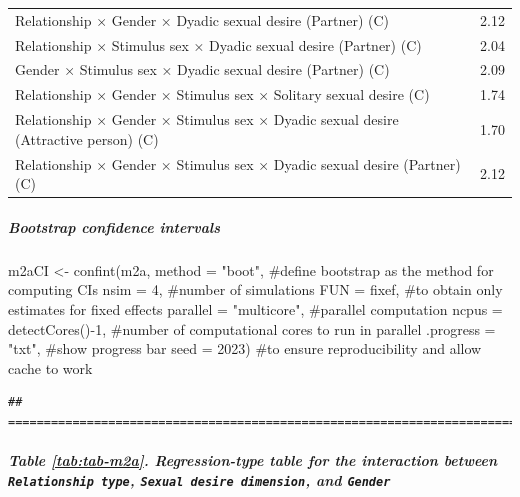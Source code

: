 \documentclass[
  bookmarksnumbered]{article}
\newenvironment{Shaded}{\begin{snugshade}}{\end{snugshade}}
\newcommand{\AttributeTok}[1]{\textcolor[rgb]{0.80,0.80,0.80}{#1}}
\newcommand{\CommentTok}[1]{\textcolor[rgb]{0.50,0.62,0.50}{#1}}
\newcommand{\DecValTok}[1]{\textcolor[rgb]{0.86,0.86,0.80}{#1}}
\newcommand{\FunctionTok}[1]{\textcolor[rgb]{0.94,0.94,0.56}{#1}}
\newcommand{\NormalTok}[1]{\textcolor[rgb]{0.80,0.80,0.80}{#1}}
\newcommand{\OtherTok}[1]{\textcolor[rgb]{0.94,0.94,0.56}{#1}}
\newcommand{\SpecialCharTok}[1]{\textcolor[rgb]{0.86,0.64,0.64}{#1}}
\newcommand{\StringTok}[1]{\textcolor[rgb]{0.80,0.58,0.58}{#1}}
\begin{document}
\begin{table}[H]
\begin{tabular}[t]{lc}
Relationship × Gender × Dyadic sexual desire (Partner) (C) & 2.12\\
Relationship × Stimulus sex × Dyadic sexual desire (Partner) (C) & 2.04\\
Gender × Stimulus sex × Dyadic sexual desire (Partner) (C) & 2.09\\
Relationship × Gender × Stimulus sex × Solitary sexual desire (C) & 1.74\\
Relationship × Gender × Stimulus sex × Dyadic sexual desire (Attractive person) (C) & 1.70\\
Relationship × Gender × Stimulus sex × Dyadic sexual desire (Partner) (C) & 2.12\\
\bottomrule
\end{tabular}
\end{table}

\hypertarget{bootstrap-confidence-intervals}{%
\subparagraph{Bootstrap confidence intervals}\label{bootstrap-confidence-intervals}}

\begin{Shaded}
\begin{Highlighting}[]
\NormalTok{m2aCI }\OtherTok{\textless{}{-}} \FunctionTok{confint}\NormalTok{(m2a, }
                 \AttributeTok{method =} \StringTok{"boot"}\NormalTok{, }\CommentTok{\#define bootstrap as the method for computing CIs}
                 \AttributeTok{nsim =} \DecValTok{4}\NormalTok{, }\CommentTok{\#number of simulations}
                 \AttributeTok{FUN =}\NormalTok{ fixef, }\CommentTok{\#to obtain only estimates for fixed effects}
                 \AttributeTok{parallel =} \StringTok{"multicore"}\NormalTok{, }\CommentTok{\#parallel computation}
                 \AttributeTok{ncpus =} \FunctionTok{detectCores}\NormalTok{()}\SpecialCharTok{{-}}\DecValTok{1}\NormalTok{, }\CommentTok{\#number of computational cores to run in parallel}
                 \AttributeTok{.progress =} \StringTok{"txt"}\NormalTok{, }\CommentTok{\#show progress bar}
                 \AttributeTok{seed =} \DecValTok{2023}\NormalTok{) }\CommentTok{\#to ensure reproducibility and allow cache to work}
\end{Highlighting}
\end{Shaded}

\begin{verbatim}
## ================================================================================
\end{verbatim}

\hypertarget{table-reftabtab-m2a.-regression-type-table-for-the-interaction-between-relationship-type-sexual-desire-dimension-and-gender}{%
\subparagraph{\texorpdfstring{Table \ref{tab:tab-m2a}. Regression-type table for the interaction between \texttt{Relationship\ type}, \texttt{Sexual\ desire\ dimension}, and \texttt{Gender}}{Table \ref{tab:tab-m2a}. Regression-type table for the interaction between Relationship type, Sexual desire dimension, and Gender}}\label{table-reftabtab-m2a.-regression-type-table-for-the-interaction-between-relationship-type-sexual-desire-dimension-and-gender}}
\end{document}
